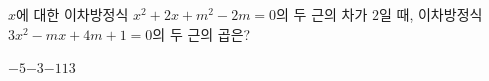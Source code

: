 $x$에 대한 이차방정식 $x^2+2x+m^2-2m=0$의 두 근의 차가 $2$일 때, 이차방정식 $3x^2-mx+4m+1=0$의 두 근의 곱은? 
\begin{choices32}{$-5$}{$-3$}{$-1$}{$1$}{$3$}\end{choices32}
